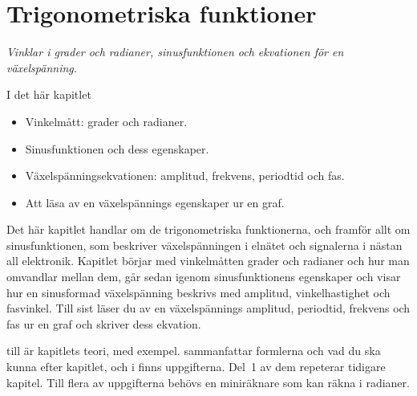
\chapter{Trigonometriska funktioner}
\label{c9:ch}

{\large\itshape Vinklar i grader och radianer, sinusfunktionen och ekvationen för en
växelspänning.\par}

\begin{chapterbox}{I det här kapitlet}
\begin{itemize}
  \item Vinkelmått: grader och radianer.
  \item Sinusfunktionen och dess egenskaper.
  \item Växelspänningsekvationen: amplitud, frekvens, periodtid och fas.
  \item Att läsa av en växelspännings egenskaper ur en graf.
\end{itemize}
\end{chapterbox}

Det här kapitlet handlar om de trigonometriska funktionerna, och framför allt om sinusfunktionen,
som beskriver växelspänningen i elnätet och signalerna i nästan all elektronik. Kapitlet börjar
med vinkelmåtten grader och radianer och hur man omvandlar mellan dem, går sedan igenom
sinusfunktionens egenskaper och visar hur en sinusformad växelspänning beskrivs med amplitud,
vinkelhastighet och fasvinkel. Till sist läser du av en växelspännings amplitud, periodtid,
frekvens och fas ur en graf och skriver dess ekvation.

 till  är kapitlets teori, med exempel.
 sammanfattar formlerna och vad du ska kunna efter kapitlet, och i
 finns uppgifterna. Del~1 av dem repeterar tidigare kapitel. Till flera
av uppgifterna behövs en miniräknare som kan räkna i radianer.




